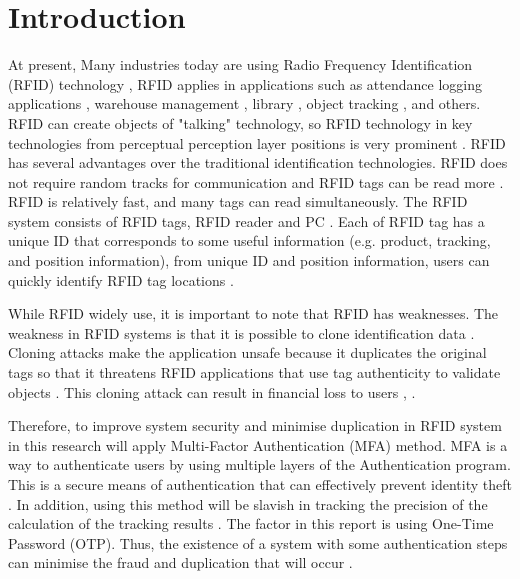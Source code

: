 \section{Introduction}
\label{Introduction}
At present, Many industries today are using Radio Frequency Identification (RFID) technology \cite{Zaman2017}, RFID applies in applications such as attendance logging applications \cite{Eridani2015}, warehouse management \cite{xie2014efficiently}, library \cite{liu2017rf}, object tracking \cite{bu2015deterministic}, and others. RFID can create objects of "talking" technology, so RFID technology in key technologies from perceptual perception layer positions is very prominent \cite{pane2018qualitative}. RFID has several advantages over the traditional identification technologies. RFID does not require random tracks for communication and RFID tags can be read more \cite{Arjona2015}. RFID is relatively fast, and many tags can read simultaneously. The RFID system consists of RFID tags, RFID reader and PC \cite{Almaaitah2014}. Each of RFID tag has a unique ID that corresponds to some useful information (e.g. product, tracking, and position information), from unique ID and position information, users can quickly identify RFID tag locations \cite{Xu2016}.\par
While RFID widely use, it is important to note that RFID has weaknesses. The weakness in RFID systems is that it is possible to clone identification data \cite{basilio2016multifactor}. Cloning attacks make the application unsafe because it duplicates the original tags so that it threatens RFID applications that use tag authenticity to validate objects \cite{maleki2017new}. This cloning attack can result in financial loss to users \cite{shao2015protar}, \cite{huang2017dtd}.\par
Therefore, to improve system security and minimise duplication in RFID system in this research will apply Multi-Factor Authentication (MFA) method. MFA is a way to authenticate users by using multiple layers of the Authentication program. This is a secure means of authentication that can effectively prevent identity theft \cite{Venukumar2016}. In addition, using this method will be slavish in tracking the precision of the calculation of the tracking results \cite{Awangga2017}. The factor in this report is using One-Time Password (OTP). Thus, the existence of a system with some authentication steps can minimise the fraud and duplication that will occur \cite{jacob2015mobile}.
